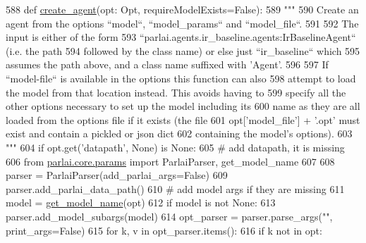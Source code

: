 \begin{DoxyCode}
588 \textcolor{keyword}{def }\hyperlink{namespaceparlai_1_1core_1_1agents_a00d77a7e26fb89e8bd900f7b2a02982a}{create\_agent}(opt: Opt, requireModelExists=\textcolor{keyword}{False}):
589     \textcolor{stringliteral}{"""}
590 \textcolor{stringliteral}{    Create an agent from the options ``model``, ``model\_params`` and ``model\_file``.}
591 \textcolor{stringliteral}{}
592 \textcolor{stringliteral}{    The input is either of the form}
593 \textcolor{stringliteral}{    ``parlai.agents.ir\_baseline.agents:IrBaselineAgent`` (i.e. the path}
594 \textcolor{stringliteral}{    followed by the class name) or else just ``ir\_baseline`` which}
595 \textcolor{stringliteral}{    assumes the path above, and a class name suffixed with 'Agent'.}
596 \textcolor{stringliteral}{}
597 \textcolor{stringliteral}{    If ``model-file`` is available in the options this function can also}
598 \textcolor{stringliteral}{    attempt to load the model from that location instead. This avoids having to}
599 \textcolor{stringliteral}{    specify all the other options necessary to set up the model including its}
600 \textcolor{stringliteral}{    name as they are all loaded from the options file if it exists (the file}
601 \textcolor{stringliteral}{    opt['model\_file'] + '.opt' must exist and contain a pickled or json dict}
602 \textcolor{stringliteral}{    containing the model's options).}
603 \textcolor{stringliteral}{    """}
604     \textcolor{keywordflow}{if} opt.get(\textcolor{stringliteral}{'datapath'}, \textcolor{keywordtype}{None}) \textcolor{keywordflow}{is} \textcolor{keywordtype}{None}:
605         \textcolor{comment}{# add datapath, it is missing}
606         \textcolor{keyword}{from} \hyperlink{namespaceparlai_1_1core_1_1params}{parlai.core.params} \textcolor{keyword}{import} ParlaiParser, get\_model\_name
607 
608         parser = ParlaiParser(add\_parlai\_args=\textcolor{keyword}{False})
609         parser.add\_parlai\_data\_path()
610         \textcolor{comment}{# add model args if they are missing}
611         model = \hyperlink{namespaceparlai_1_1core_1_1params_a6d160324f6af84562334fd0698141074}{get\_model\_name}(opt)
612         \textcolor{keywordflow}{if} model \textcolor{keywordflow}{is} \textcolor{keywordflow}{not} \textcolor{keywordtype}{None}:
613             parser.add\_model\_subargs(model)
614         opt\_parser = parser.parse\_args(\textcolor{stringliteral}{""}, print\_args=\textcolor{keyword}{False})
615         \textcolor{keywordflow}{for} k, v \textcolor{keywordflow}{in} opt\_parser.items():
616             \textcolor{keywordflow}{if} k \textcolor{keywordflow}{not} \textcolor{keywordflow}{in} opt:

\end{DoxyCode}
